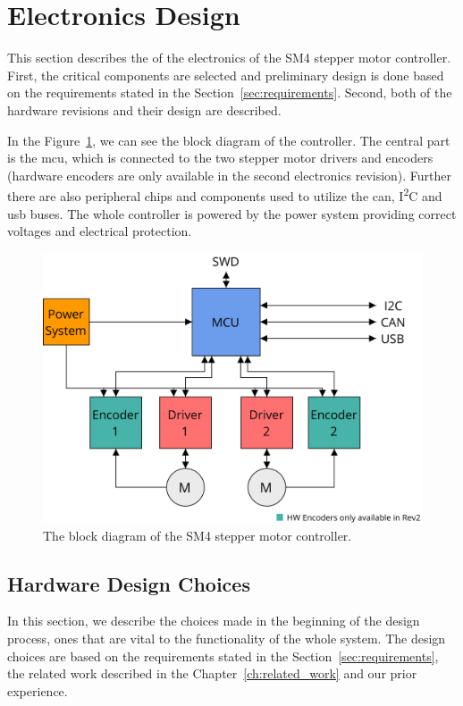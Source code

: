 \section{Electronics Design}
\label{sec:hardware}

This section describes the of the electronics of the SM4 stepper motor controller.
First, the critical components are selected and preliminary design is done based on the requirements stated in the Section~\ref{sec:requirements}.
Second, both of the hardware revisions and their design are described.

In the Figure~\ref{fig:sm4diagram}, we can see the block diagram of the controller.
The central part is the \acs{mcu}, which is connected to the two stepper motor drivers and encoders (hardware encoders are only available in the second electronics revision).
Further there are also peripheral chips and components used to utilize the \acs{can}, I\textsuperscript{2}C and \acs{usb} buses.
The whole controller is powered by the power system providing correct voltages and electrical protection.

\begin{figure}[H]
    \centering
    \includegraphics[width=\textwidth]{obrazky/sm4_block_diagram}
    \caption{The block diagram of the SM4 stepper motor controller.}
    \label{fig:sm4diagram}
\end{figure}


\subsection{Hardware Design Choices}
\label{subsec:hardware_design_choices}
In this section, we describe the choices made in the beginning of the design process, ones that are vital to the functionality of the whole system.
The design choices are based on the requirements stated in the Section~\ref{sec:requirements}, the related work described in the Chapter~\ref{ch:related_work} and our prior experience.

